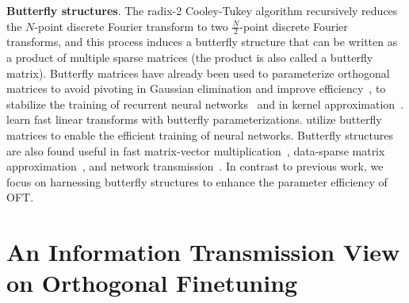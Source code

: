 \textbf{Butterfly structures}. The radix-2 Cooley-Tukey algorithm recursively reduces the $N$-point discrete Fourier transform to two $\frac{N}{2}$-point discrete Fourier transforms, and this process induces a butterfly structure that can be written as a product of multiple sparse matrices (the product is also called a butterfly matrix). Butterfly matrices have already been used to parameterize  orthogonal matrices to avoid pivoting in Gaussian elimination and improve efficiency~\cite{parker1995random}, to stabilize the training of recurrent neural networks~\cite{jing2017tunable} and in kernel approximation~\cite{munkhoeva2018quadrature}. \cite{dao2019learning,dao2019kaleidoscope} learn fast linear transforms with butterfly parameterizations. \cite{chen2022pixelated,dao2022monarch} utilize  butterfly matrices to enable the efficient training of neural networks. Butterfly structures are also found useful in fast matrix-vector multiplication~\cite{michielssen1996multilevel,o2010algorithm}, data-sparse matrix approximation~\cite{li2015butterfly}, and network transmission~\cite{klasing1994broadcasting,li2003linear,rajasingh2016transmission}. In contrast to previous work, we focus on harnessing butterfly structures to enhance the parameter efficiency of OFT.

\vspace{-1.5mm}
\section{An Information Transmission View on Orthogonal Finetuning}
\vspace{-1.5mm}



